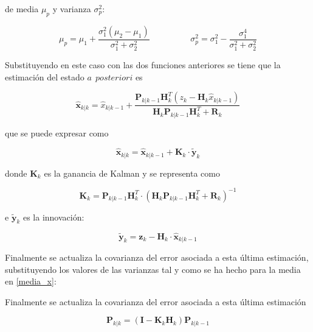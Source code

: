\documentclass[twoside,11pt]{book}
\begin{document}
de media $\mu_{p}$ y varianza $\sigma^{2}_{p}$:

\begin{equation}
\mu_{p}=\mu_{1}+\frac{\sigma^{2}_{1}(\mu_{2}-\mu_{1})}{\sigma^{2}_{1}+\sigma^{2}_{2}} \hspace{2cm} \sigma^{2}_{p} = \sigma^{2}_{1} - \frac{\sigma^{4}_{1}}{\sigma^{2}_{1} + \sigma^{2}_{2}} 
\end{equation}	

Substituyendo en este caso con las dos funciones anteriores se tiene que la estimación del estado $a \>\> posteriori$ es 

\begin{equation}
\hat{\pmb{x}}_{k|k}=\hat{x}_{k|k-1} + \frac{\mathbf{P}_{k|k-1}\mathbf{H}^{T}_{k}(z_{k}-\mathbf{H}_{k}\hat{x}_{k|k-1})}{\mathbf{H}_{k} \mathbf{P}_{k|k-1} \mathbf{H}_{k}^{T} + \mathbf{R}_{k}}
\label{media_x}
\end{equation}

que se puede expresar como

\begin{equation}
\hat{\mathbf{x}}_{k|k}=\hat{\mathbf{x}}_{k|k-1}+\mathbf{K}_{k}\cdot \tilde{\mathbf{y}}_{k}
\end{equation}

donde $\mathbf{K}_{k}$ es la ganancia de Kalman y se representa como

\begin{equation}
\mathbf{K}_{k}=\mathbf{P}_{k|k-1} \mathbf{H}_{k}^{T} \cdot (\mathbf{H}_{k} \mathbf{P}_{k|k-1} \mathbf{H}_{k}^{T} + \mathbf{R}_{k})^{-1}
\end{equation}

e $\tilde{\mathbf{y}}_{k}$ es la innovación:

\begin{equation}
\tilde{\mathbf{y}}_{k} = \mathbf{z}_{k} - \mathbf{H}_{k} \cdot \hat{\mathbf{x}}_{k|k-1}
\end{equation}


Finalmente se actualiza la covarianza del error asociada a esta última estimación, substituyendo los valores de las varianzas tal y como se ha hecho para la media en \ref{media_x}:

Finalmente se actualiza la covarianza del error asociada a esta última estimación


\begin{equation}
\mathbf{P}_{k|k} = (\mathbf{I} - \mathbf{K}_{k}\mathbf{H}_{k})\mathbf{P}_{k|k-1}
\end{equation}
\end{document}
